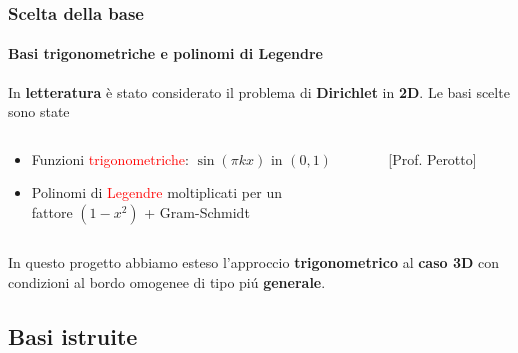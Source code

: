 \begin{frame}
 \frametitle{Scelta della base}
 \framesubtitle{Basi trigonometriche e polinomi di Legendre}
 In \textbf{letteratura} \`e stato considerato il problema di \textbf{Dirichlet} in \textbf{2D}.
 Le basi scelte sono state
 \begin{columns}
 \begin{column}{0.7\textwidth}
 \begin{itemize}
  \item Funzioni \textcolor{red}{trigonometriche}: $\sin(\pi k x)\text{ in }(0,1)$ 
  \item Polinomi di \textcolor{red}{Legendre} moltiplicati per un \\fattore $(1-x^2)$ + Gram-Schmidt 
 \end{itemize}
 \end{column}
 \begin{column}{0.3\textwidth}
 \footnotesize
  [Prof. Perotto]
  \vspace{0.45cm}
  
 \end{column}
 \end{columns}
\begin{alertblock}{In questo progetto}
 abbiamo esteso l'approccio \textbf{trigonometrico} al \textbf{caso 3D} con condizioni al bordo omogenee di tipo pi\'u \textbf{generale}.
\end{alertblock}

\end{frame}

 
\subsection{Basi istruite}

\begin{frame}
\tableofcontents[currentsection]
\end{frame}

